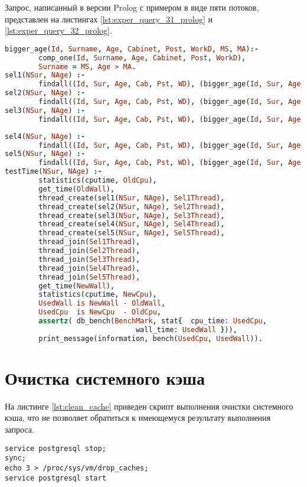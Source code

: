Запрос, написанный в версии Prolog с примером в виде пяти потоков, представлен на листингах \ref{lst:exper_query_31_prolog} и \ref{lst:exper_query_32_prolog}.
\begin{lstlisting}[label=lst:exper_query_31_prolog, caption=Запрос c оператором SELECT с использованием 5 потоков (Prolog). Часть 1., basicstyle=\small, numbers = none, language=Prolog]
bigger_age(Id, Surname, Age, Cabinet, Post, WorkD, MS, MA):-
        comp_one(Id, Surname, Age, Cabinet, Post, WorkD),
        Surname = MS, Age > MA.
sel1(NSur, NAge) :-
        findall((Id, Sur, Age, Cab, Pst, WD), (bigger_age(Id, Sur, Age, Cab, Pst, WD, NSur, NAge), Id < 2000000), _).
sel2(NSur, NAge) :-
        findall((Id, Sur, Age, Cab, Pst, WD), (bigger_age(Id, Sur, Age, Cab, Pst, WD, NSur, NAge), Id >= 2000000, Id < 4000000), _).
sel3(NSur, NAge) :-
        findall((Id, Sur, Age, Cab, Pst, WD), (bigger_age(Id, Sur, Age, Cab, Pst, WD, NSur, NAge), Id >= 4000000, Id < 6000000), _).
\end{lstlisting}
\newpage
\begin{lstlisting}[label=lst:exper_query_32_prolog, caption=Запрос c оператором SELECT с использованием 5 потоков (Prolog). Часть 2., basicstyle=\small, numbers = none, language=Prolog]
sel4(NSur, NAge) :-
        findall((Id, Sur, Age, Cab, Pst, WD), (bigger_age(Id, Sur, Age, Cab, Pst, WD, NSur, NAge), Id >= 6000000, Id < 8000000), _).
sel5(NSur, NAge) :-
        findall((Id, Sur, Age, Cab, Pst, WD), (bigger_age(Id, Sur, Age, Cab, Pst, WD, NSur, NAge), Id >= 8000000), _).
testTime(NSur, NAge) :-
        statistics(cputime, OldCpu),
        get_time(OldWall),
        thread_create(sel1(NSur, NAge), Sel1Thread),
        thread_create(sel2(NSur, NAge), Sel2Thread),
        thread_create(sel3(NSur, NAge), Sel3Thread),
        thread_create(sel4(NSur, NAge), Sel4Thread),
        thread_create(sel5(NSur, NAge), Sel5Thread),
        thread_join(Sel1Thread),
        thread_join(Sel2Thread),
        thread_join(Sel3Thread),
        thread_join(Sel4Thread),
        thread_join(Sel5Thread),
        get_time(NewWall),
        statistics(cputime, NewCpu),
        UsedWall is NewWall - OldWall,
        UsedCpu  is NewCpu  - OldCpu,
        assertz( db_bench(BenchMark, stat{  cpu_time: UsedCpu,
                               wall_time: UsedWall })),
        print_message(information, bench(UsedCpu, UsedWall)).
\end{lstlisting}

\section{Очистка системного кэша}
\vspace{-0.5cm}
На листинге \ref{lst:clean_cache} приведен скрипт выполнения очистки системного кэша, что не позволяет обратиться к имеющемуся результату выполнения запроса. 
\newpage
\begin{lstlisting}[label=lst:clean_cache, caption=Очистка кэша, basicstyle=\small, numbers = none]
service postgresql stop;
sync;
echo 3 > /proc/sys/vm/drop_caches;
service postgresql start
\end{lstlisting}

